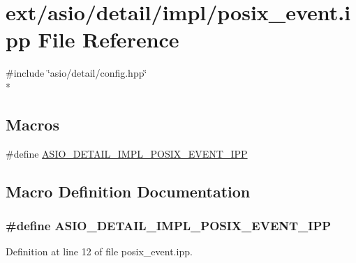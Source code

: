 \hypertarget{posix__event_8ipp}{}\section{ext/asio/detail/impl/posix\+\_\+event.ipp File Reference}
\label{posix__event_8ipp}
{\ttfamily \#include \char`\"{}asio/detail/config.\+hpp\char`\"{}}\\*
\subsection*{Macros}
\begin{DoxyCompactItemize}
\item 
\#define \hyperlink{posix__event_8ipp_a8a0399151cb21a030db5f464918b2b66}{A\+S\+I\+O\+\_\+\+D\+E\+T\+A\+I\+L\+\_\+\+I\+M\+P\+L\+\_\+\+P\+O\+S\+I\+X\+\_\+\+E\+V\+E\+N\+T\+\_\+\+I\+P\+P}
\end{DoxyCompactItemize}


\subsection{Macro Definition Documentation}
\hypertarget{posix__event_8ipp_a8a0399151cb21a030db5f464918b2b66}{}
\subsubsection[{A\+S\+I\+O\+\_\+\+D\+E\+T\+A\+I\+L\+\_\+\+I\+M\+P\+L\+\_\+\+P\+O\+S\+I\+X\+\_\+\+E\+V\+E\+N\+T\+\_\+\+I\+P\+P}]{\setlength{\rightskip}{0pt plus 5cm}\#define A\+S\+I\+O\+\_\+\+D\+E\+T\+A\+I\+L\+\_\+\+I\+M\+P\+L\+\_\+\+P\+O\+S\+I\+X\+\_\+\+E\+V\+E\+N\+T\+\_\+\+I\+P\+P}\label{posix__event_8ipp_a8a0399151cb21a030db5f464918b2b66}


Definition at line 12 of file posix\+\_\+event.\+ipp.

